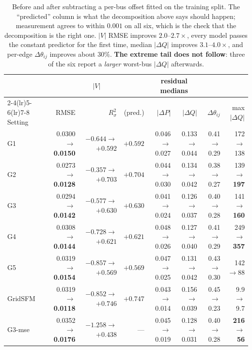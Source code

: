 \documentclass[10pt]{article}
\begin{document}
\begin{table}[H]
\centering\footnotesize
\setlength{\tabcolsep}{2.2pt}
\begin{tabular}{lrrrrrrr}
\toprule
& \multicolumn{3}{c}{$|V|$} & \multicolumn{2}{c}{residual medians} & \multicolumn{2}{c}{}\\
\cmidrule(lr){2-4}\cmidrule(lr){5-6}\cmidrule(lr){7-8}
Setting & RMSE & $R^2_{\sigma}$ & (pred.) & $|\Delta P|$ & $|\Delta Q|$ & $\Delta\theta_{ij}$ & max $|\Delta Q|$\\
\midrule
G1 & 0.0300$\to$\textbf{0.0150} & $-0.644\to$\textbf{$+0.592$} & $+0.592$ & 0.046$\to$0.027 & 0.133$\to$0.044 & 0.41$\to$0.29 & 172$\to$138\\
G2 & 0.0273$\to$\textbf{0.0128} & $-0.357\to$\textbf{$+0.703$} & $+0.704$ & 0.044$\to$0.030 & 0.134$\to$0.042 & 0.38$\to$0.27 & 139$\to$\textbf{197}\\
G3 & 0.0294$\to$\textbf{0.0142} & $-0.577\to$\textbf{$+0.630$} & $+0.630$ & 0.041$\to$0.024 & 0.126$\to$0.037 & 0.40$\to$0.28 & 141$\to$\textbf{160}\\
G4 & 0.0308$\to$\textbf{0.0144} & $-0.728\to$\textbf{$+0.621$} & $+0.621$ & 0.048$\to$0.026 & 0.127$\to$0.040 & 0.41$\to$0.29 & 249$\to$\textbf{357}\\
G5 & 0.0319$\to$\textbf{0.0154} & $-0.857\to$\textbf{$+0.569$} & $+0.569$ & 0.047$\to$0.025 & 0.131$\to$0.042 & 0.43$\to$0.30 & 142$\to$88\\
GridSFM & 0.0319$\to$\textbf{0.0118} & $-0.852\to$\textbf{$+0.746$} & $+0.747$ & 0.043$\to$0.014 & 0.156$\to$0.039 & 0.45$\to$0.23 & 9.9$\to$9.7\\
G3-mse & 0.0352$\to$\textbf{0.0176} & $-1.258\to$\textbf{$+0.438$} & --- & 0.045$\to$0.019 & 0.128$\to$0.031 & 0.40$\to$0.28 & \textbf{216$\to$56}\\
\bottomrule
\end{tabular}
\caption{Before and after subtracting a per-bus offset fitted on the training
split.  The ``predicted'' column is what the decomposition above says should
happen; measurement agrees to within $0.001$ on all six, which is the check
that the decomposition is the right one.  $|V|$ RMSE improves
$2.0$--$2.7\times$, every model passes the constant predictor for the first
time, median $|\Delta Q|$ improves $3.1$--$4.0\times$, and per-edge
$\Delta\theta_{ij}$ improves about $30\%$.  \textbf{The extreme tail does not
follow}: three of the six report a \emph{larger} worst-bus $|\Delta Q|$
afterwards.}
\end{table}
\end{document}
